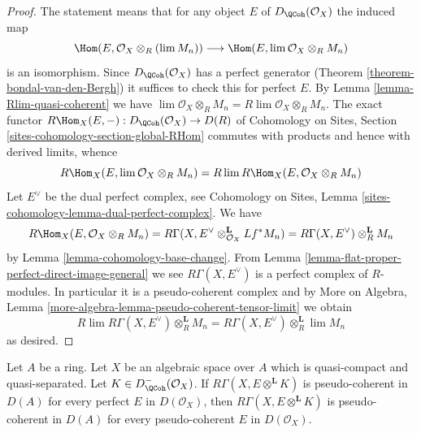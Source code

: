\begin{proof}
The statement means that for any object $E$ of
$D_\QCoh(\mathcal{O}_X)$ the induced map
$$
\Hom(E, \mathcal{O}_X \otimes_R (\lim M_n))
\longrightarrow
\Hom(E, \lim \mathcal{O}_X \otimes_R M_n)
$$
is an isomorphism. Since $D_\QCoh(\mathcal{O}_X)$ has
a perfect generator (Theorem \ref{theorem-bondal-van-den-Bergh})
it suffices to check this for perfect $E$.
By Lemma \ref{lemma-Rlim-quasi-coherent} we have
$\lim \mathcal{O}_X \otimes_R M_n = R\lim \mathcal{O}_X \otimes_R M_n$.
The exact functor
$R\Hom_X(E, -) : D_\QCoh(\mathcal{O}_X) \to D(R)$
of Cohomology on Sites, Section \ref{sites-cohomology-section-global-RHom}
commutes with products and hence with derived limits, whence
$$
R\Hom_X(E, \lim \mathcal{O}_X \otimes_R M_n) =
R\lim R\Hom_X(E, \mathcal{O}_X \otimes_R M_n)
$$
Let $E^\vee$ be the dual perfect complex, see
Cohomology on Sites, Lemma \ref{sites-cohomology-lemma-dual-perfect-complex}.
We have
$$
R\Hom_X(E, \mathcal{O}_X \otimes_R M_n) =
R\Gamma(X, E^\vee \otimes_{\mathcal{O}_X}^\mathbf{L} Lf^*M_n) =
R\Gamma(X, E^\vee) \otimes_R^\mathbf{L} M_n
$$
by Lemma \ref{lemma-cohomology-base-change}.
From Lemma \ref{lemma-flat-proper-perfect-direct-image-general}
we see $R\Gamma(X, E^\vee)$ is a perfect complex of $R$-modules.
In particular it is a pseudo-coherent complex and by
More on Algebra, Lemma \ref{more-algebra-lemma-pseudo-coherent-tensor-limit}
we obtain
$$
R\lim R\Gamma(X, E^\vee) \otimes_R^\mathbf{L} M_n =
R\Gamma(X, E^\vee) \otimes_R^\mathbf{L} \lim M_n
$$
as desired.
\end{proof}

\begin{lemma}
\label{lemma-perfect-enough}
Let $A$ be a ring. Let $X$ be an algebraic space over $A$ which is
quasi-compact and quasi-separated. Let $K \in D^-_\QCoh(\mathcal{O}_X)$.
If $R\Gamma(X, E \otimes^\mathbf{L} K)$ is pseudo-coherent
in $D(A)$ for every perfect $E$ in $D(\mathcal{O}_X)$,
then $R\Gamma(X, E \otimes^\mathbf{L} K)$ is pseudo-coherent
in $D(A)$ for every pseudo-coherent $E$ in $D(\mathcal{O}_X)$.
\end{lemma}

